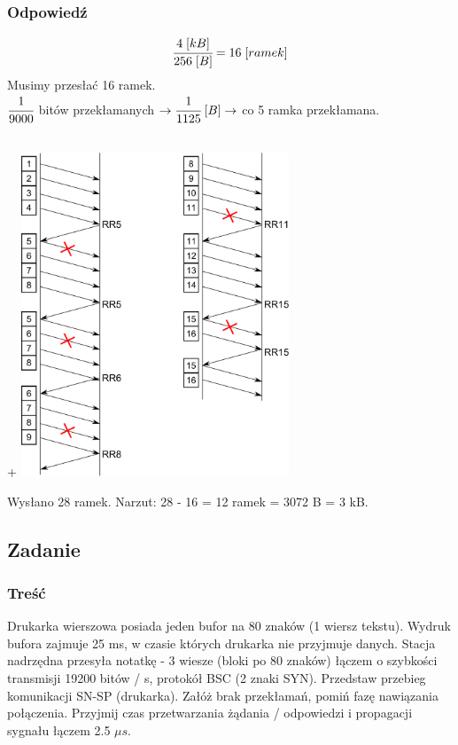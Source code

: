\documentclass[a4paper,twoside]{article}
\begin{document}
\subsubsection{Odpowiedź}
$$ \cfrac{4\;[kB]}{256\;[B]}=16\;[ramek] $$
Musimy przesłać 16 ramek.\\
$ \cfrac{1}{9000} $ bitów przekłamanych $ \rightarrow \cfrac{1}{1125}\;[B] \rightarrow $ co 5 ramka przekłamana.\\\\
\begin{center}+
	\includegraphics[width=8.0cm]{./images/zadanie12.pdf}
\end{center}
Wysłano 28 ramek. Narzut: 28 - 16 = 12 ramek = 3072 B = 3 kB.
\newpage		
\subsection{Zadanie}
\subsubsection{Treść}
Drukarka wierszowa posiada jeden bufor na 80 znaków (1 wiersz tekstu). Wydruk bufora zajmuje 25 ms, w czasie których drukarka nie przyjmuje danych. Stacja nadrzędna przesyła notatkę - 3 wiesze (bloki po 80 znaków) łączem o szybkości transmisji 19200 bitów / s, protokół BSC (2 znaki SYN). Przedstaw przebieg komunikacji SN-SP (drukarka). Załóż brak przekłamań, pomiń fazę nawiązania połączenia. Przyjmij czas przetwarzania żądania / odpowiedzi i propagacji sygnału łączem 2.5 $ \mu s $.
\end{document}

